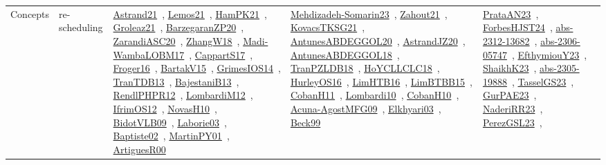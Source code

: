 {\begin{longtable}{lp{3cm}>{\raggedright\arraybackslash}p{6cm}>{\raggedright\arraybackslash}p{6cm}>{\raggedright\arraybackslash}p{8cm}}
Concepts & re-scheduling & \href{works/Astrand21.pdf}{Astrand21}~\cite{Astrand21}, \href{works/Lemos21.pdf}{Lemos21}~\cite{Lemos21}, \href{works/HamPK21.pdf}{HamPK21}~\cite{HamPK21}, \href{works/Groleaz21.pdf}{Groleaz21}~\cite{Groleaz21}, \href{works/BarzegaranZP20.pdf}{BarzegaranZP20}~\cite{BarzegaranZP20}, \href{works/ZarandiASC20.pdf}{ZarandiASC20}~\cite{ZarandiASC20}, \href{works/ZhangW18.pdf}{ZhangW18}~\cite{ZhangW18}, \href{works/Madi-WambaLOBM17.pdf}{Madi-WambaLOBM17}~\cite{Madi-WambaLOBM17}, \href{works/CappartS17.pdf}{CappartS17}~\cite{CappartS17}, \href{works/Froger16.pdf}{Froger16}~\cite{Froger16}, \href{works/BartakV15.pdf}{BartakV15}~\cite{BartakV15}, \href{works/GrimesIOS14.pdf}{GrimesIOS14}~\cite{GrimesIOS14}, \href{works/TranTDB13.pdf}{TranTDB13}~\cite{TranTDB13}, \href{works/BajestaniB13.pdf}{BajestaniB13}~\cite{BajestaniB13}, \href{works/RendlPHPR12.pdf}{RendlPHPR12}~\cite{RendlPHPR12}, \href{works/LombardiM12.pdf}{LombardiM12}~\cite{LombardiM12}, \href{works/IfrimOS12.pdf}{IfrimOS12}~\cite{IfrimOS12}, \href{works/NovasH10.pdf}{NovasH10}~\cite{NovasH10}, \href{works/BidotVLB09.pdf}{BidotVLB09}~\cite{BidotVLB09}, \href{works/Laborie03.pdf}{Laborie03}~\cite{Laborie03}, \href{works/Baptiste02.pdf}{Baptiste02}~\cite{Baptiste02}, \href{works/MartinPY01.pdf}{MartinPY01}~\cite{MartinPY01}, \href{works/ArtiguesR00.pdf}{ArtiguesR00}~\cite{ArtiguesR00} & \href{works/Mehdizadeh-Somarin23.pdf}{Mehdizadeh-Somarin23}~\cite{Mehdizadeh-Somarin23}, \href{works/Zahout21.pdf}{Zahout21}~\cite{Zahout21}, \href{works/KovacsTKSG21.pdf}{KovacsTKSG21}~\cite{KovacsTKSG21}, \href{works/AntunesABDEGGOL20.pdf}{AntunesABDEGGOL20}~\cite{AntunesABDEGGOL20}, \href{works/AstrandJZ20.pdf}{AstrandJZ20}~\cite{AstrandJZ20}, \href{works/AntunesABDEGGOL18.pdf}{AntunesABDEGGOL18}~\cite{AntunesABDEGGOL18}, \href{works/TranPZLDB18.pdf}{TranPZLDB18}~\cite{TranPZLDB18}, \href{works/HoYCLLCLC18.pdf}{HoYCLLCLC18}~\cite{HoYCLLCLC18}, \href{works/HurleyOS16.pdf}{HurleyOS16}~\cite{HurleyOS16}, \href{works/LimHTB16.pdf}{LimHTB16}~\cite{LimHTB16}, \href{works/LimBTBB15.pdf}{LimBTBB15}~\cite{LimBTBB15}, \href{works/CobanH11.pdf}{CobanH11}~\cite{CobanH11}, \href{works/Lombardi10.pdf}{Lombardi10}~\cite{Lombardi10}, \href{works/CobanH10.pdf}{CobanH10}~\cite{CobanH10}, \href{works/Acuna-AgostMFG09.pdf}{Acuna-AgostMFG09}~\cite{Acuna-AgostMFG09}, \href{works/Elkhyari03.pdf}{Elkhyari03}~\cite{Elkhyari03}, \href{works/Beck99.pdf}{Beck99}~\cite{Beck99} & \href{works/PrataAN23.pdf}{PrataAN23}~\cite{PrataAN23}, \href{works/ForbesHJST24.pdf}{ForbesHJST24}~\cite{ForbesHJST24}, \href{works/abs-2312-13682.pdf}{abs-2312-13682}~\cite{abs-2312-13682}, \href{works/abs-2306-05747.pdf}{abs-2306-05747}~\cite{abs-2306-05747}, \href{works/EfthymiouY23.pdf}{EfthymiouY23}~\cite{EfthymiouY23}, \href{works/ShaikhK23.pdf}{ShaikhK23}~\cite{ShaikhK23}, \href{works/abs-2305-19888.pdf}{abs-2305-19888}~\cite{abs-2305-19888}, \href{works/TasselGS23.pdf}{TasselGS23}~\cite{TasselGS23}, \href{works/GurPAE23.pdf}{GurPAE23}~\cite{GurPAE23}, \href{works/NaderiRR23.pdf}{NaderiRR23}~\cite{NaderiRR23}, \href{works/PerezGSL23.pdf}{PerezGSL23}~\cite{PerezGSL23}, 
\end{longtable}}
